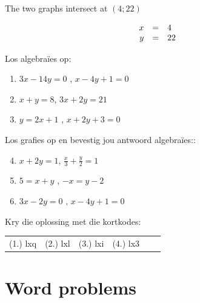 \begin{wex}
{
The two graphs intersect at $(4;22)$ 

\begin{equation*}
\begin{array}{ccl}\hfill x& =& 4\hfill \\ \hfill y& =& 22\hfill \end{array}
\end{equation*}

}
\end{wex}

\begin{exercises}{}
{
\item Los algebraïes op: 
\begin{enumerate}[noitemsep, label=\textbf{\arabic*}. ] 
\item $3x-14y=0$ , $x-4y+1=0$
\item $x+y=8$, $3x + 2y = 21$
\item $y=2x+1$ , $x + 2y + 3 = 0$
\end{enumerate}

Los grafies op en bevestig jou antwoord algebraïes::

\begin{enumerate}[noitemsep, label=\textbf{\arabic*}. ] 
\setcounter{enumi}{3}
\item  $x+2y=1$, $\frac{x}{3} + \frac{y}{2} = 1$
\item $5= x+y$ , $-x = y-2$
\item $3x - 2y = 0$ , $x - 4y + 1 = 0$

\end{enumerate}


\par {} Kry die oplossing met die kortkodes:
\par \begin{tabular}[h]{cccccc}
(1.) lxq  &  (2.) lxl  &  (3.) lxi  &  (4.) lx3  & \end{tabular}
}
\end{exercises}

\section{Word problems}

